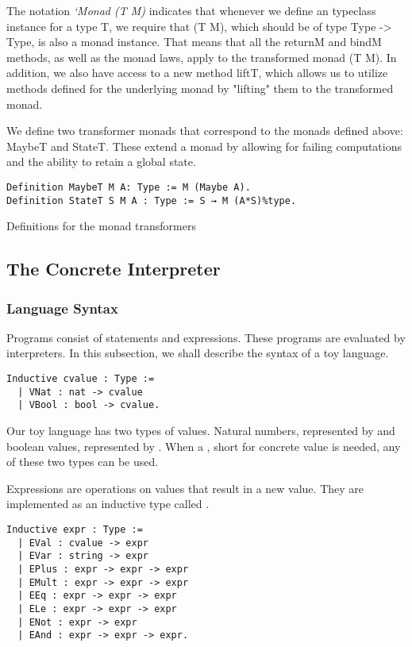 The notation \textit{`Monad (T M)} indicates that whenever we define an
typeclass instance for a type T, we require that (T M), which should be of type
Type -> Type, is also a monad instance. That means that all the returnM and
bindM methods, as well as the monad laws, apply to the transformed monad (T M).
In addition, we also have access to a new method liftT, which allows us to
utilize methods defined for the underlying monad by "lifting" them to the
transformed monad. 

We define two transformer monads that correspond to the monads defined above:
MaybeT and StateT. These extend a monad by allowing for failing computations
and the ability to retain a global state. 

\begin{listing}
\begin{verbatim}
Definition MaybeT M A: Type := M (Maybe A).
Definition StateT S M A : Type := S → M (A*S)%type.
\end{verbatim}
\caption{Definitions for the monad transformers}
\end{listing}

\subsection{The Concrete Interpreter}

\subsubsection{Language Syntax}\label{sec:lang}
Programs consist of statements and expressions. These programs are evaluated by
interpreters. In this subsection, we shall describe the syntax of a toy
language.


\begin{verbatim}
Inductive cvalue : Type :=
  | VNat : nat -> cvalue
  | VBool : bool -> cvalue.
\end{verbatim}

Our toy language has two types of values. Natural numbers, represented by
 and boolean values, represented by . 
When a , short for concrete value is needed, any of these two 
types can be used.

Expressions are operations on values that result in a new value. They are
implemented as an inductive type called . 

\begin{verbatim}
Inductive expr : Type :=
  | EVal : cvalue -> expr
  | EVar : string -> expr
  | EPlus : expr -> expr -> expr
  | EMult : expr -> expr -> expr
  | EEq : expr -> expr -> expr
  | ELe : expr -> expr -> expr
  | ENot : expr -> expr
  | EAnd : expr -> expr -> expr.
\end{verbatim}

